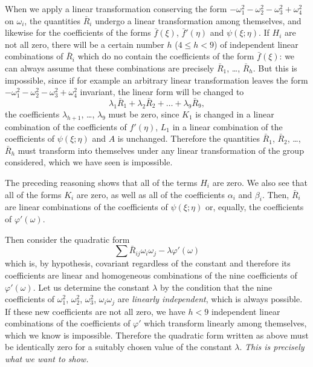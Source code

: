 \documentclass[leqno,12pt]{article}
\makeatletter
\let\old@phi\phi
\let\old@varphi\varphi
\let\phi\old@varphi
\let\varphi\old@phi
\theoremstyle{shape1}
\theoremstyle{shape0}
\theoremstyle{shape2}
\theoremstyle{definition}
\makeatother
\begin{document}
When we apply a linear transformation conserving the form $-\omega_{1}^{2}-\omega_{2}^{2}-\omega_{3}^{2}+\omega_{4}^{2}$ on $\omega_{i}$, the quantities $\bar R_{i}$ undergo a linear transformation among themselves, and likewise for the coefficients of the forms $\bar f(\xi)$, $\bar f'(\eta)$ and $\psi(\xi;\eta)$. If $H_{i}$ are not all zero, there will be a certain number $h$ ($4\le h<9$) of independent linear combinations of $\bar R_{i}$ which do no contain the coefficients of the form $\bar f(\xi)$: we can always assume that these combinations are precisely $\bar R_{1}$, \dots , $\bar R_{h}$. But this is impossible, since if for example an arbitrary linear transformation leaves the form $-\omega_{1}^{2}-\omega_{2}^{2}-\omega_{3}^{2}+\omega_{4}^{2}$ invariant, the linear form will be changed to
\[
\lambda_{1}\bar R_{1}+\lambda_{2}\bar R_{2}+\dots+\lambda_{9}\bar R_{9},
\]
the coefficients $\lambda_{h+1}$, \dots , $\lambda_{9}$ must be zero, since $K_{1}$ is changed in a linear combination of the coefficients of $f'(\eta)$, $L_{1}$ in a linear combination of the coefficients of $\psi(\xi;\eta)$ and $A$ is unchanged. Therefore the quantities $\bar R_{1}$, $\bar R_{2}$, \dots , $\bar R_{h}$ must transform into themselves under any linear transformation of the group considered, which we have seen is impossible.

The preceding reasoning shows that all of the terms $H_{i}$ are zero. We also see that all of the forms $K_{i}$ are zero, as well as all of the coefficients $\alpha_{i}$ and $\beta_{i}$. Then, $\bar R_{i}$ are linear combinations of the coefficients of $\psi(\xi;\eta)$ or, equally, the coefficients of $\phi'(\omega)$.

Then consider the quadratic form
\[
\sum\bar R_{ij}\omega_{i}\omega_{j}-\lambda\phi'(\omega)
\]
which is, by hypothesis, covariant regardless of the constant and therefore its coefficients are linear and homogeneous combinations of the nine coefficients of $\phi'(\omega)$. Let us determine the constant $\lambda$ by the condition that the nine coefficients of $\omega_{1}^{2}$, $\omega_{2}^{2}$, $\omega_{3}^{2}$, $\omega_{i}\omega_{j}$ are \emph{linearly independent}, which is always possible. If these new coefficients are not all zero, we have $h<9$ independent linear combinations of the coefficients of $\phi'$ which transform linearly among themselves, which we know is impossible. Therefore the quadratic form written as above must be identically zero for a suitably chosen value of the constant $\lambda$. \emph{This is precisely what we want to show.}
\end{document}
